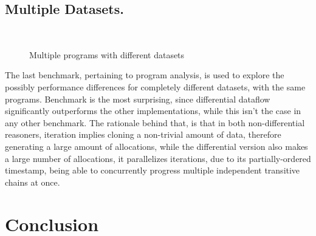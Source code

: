 \documentclass[manuscript,screen,review]{acmart}
\theoremstyle{definition}
\begin{document}
\subsection{Multiple Datasets.}

\begin{figure}[ht]
	\centering
	\\
	\caption{Multiple programs with different datasets}
	\label{benchmark:scalability}
\end{figure}

The last benchmark, pertaining to program analysis, is used to explore the possibly performance differences for completely different datasets, with the same programs. Benchmark \cite{benchmark:csda} is the most surprising, since differential dataflow significantly outperforms the other implementations, while this isn't the case in any other benchmark. The rationale behind that, is that in both non-differential reasoners, iteration implies cloning a non-trivial amount of data, therefore generating a large amount of allocations, while the differential version also makes a large number of allocations, it parallelizes iterations, due to its partially-ordered timestamp, being able to concurrently progress multiple independent transitive chains at once.

\section{Conclusion}
\end{document}
